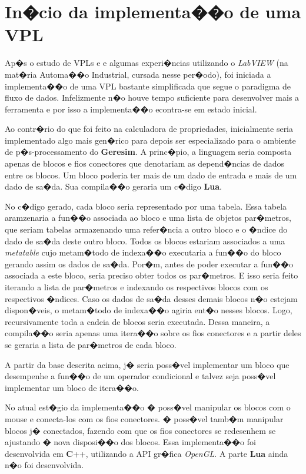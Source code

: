\documentclass[dissertacao,modelo1,brazil]{ThesisPUC}
\begin{document}
\chapter{In�cio da implementa��o de uma VPL}

Ap�s o estudo de VPLs e e algumas experi�ncias utilizando o \emph{LabVIEW}
(na mat�ria Automa��o Industrial, cursada nesse per�odo), foi iniciada
a implementa��o de uma VPL bastante simplificada que segue o paradigma de
fluxo de dados. Infelizmente n�o houve tempo suficiente para desenvolver
mais a ferramenta e por isso a implementa��o econtra-se em estado inicial.

Ao contr�rio do que foi feito na calculadora de propriedades, inicialmente
seria implementado algo mais gen�rico para depois ser especializado para
o ambiente de p�s-processamento do \textbf{Geresim}. A princ�pio, a linguagem
seria composta apenas de blocos e fios conectores que denotariam
as depend�ncias de  dados entre os blocos. Um bloco poderia ter
mais de um dado de entrada e mais de um dado de sa�da.
Sua compila��o geraria um c�digo \textbf{Lua}.

No c�digo gerado, cada bloco seria representado por uma tabela.
Essa tabela aramzenaria a fun��o associada ao bloco e uma lista
de objetos par�metros, que seriam tabelas armazenando uma refer�ncia
a outro bloco e o �ndice do dado de sa�da deste outro bloco. 
Todos os blocos estariam associados a uma \emph{metatable} cujo
metam�todo de indexa��o executaria a fun��o do bloco gerando assim
os dados de sa�da. Por�m, antes de poder executar a fun��o associada
a este bloco, seria preciso obter todos os par�metros. E isso seria
feito iterando a lista de par�metros e indexando os respectivos
blocos com os respectivos �ndices. Caso os dados de sa�da desses
demais blocos n�o estejam dispon�veis, o metam�todo de indexa��o agiria
ent�o nesses blocos. Logo, recursivamente toda a cadeia de blocos seria
executada. Dessa maneira, a compila��o seria apenas uma itera��o sobre os fios
conectores e a partir deles se geraria a lista de par�metros de cada bloco.

A partir da base descrita acima, j� seria poss�vel implementar um bloco
que desempenhe a fun��o de um operador condicional e talvez seja
poss�vel implementar um bloco de itera��o.

No atual est�gio da implementa��o � poss�vel manipular os blocos
com o mouse e conecta-los com os fios conectores. � poss�vel tamb�m
manipular blocos j� conectados, fazendo com que os fios conectores se
redesenhem se ajustando � nova disposi��o dos blocos.
Essa implementa��o foi desenvolvida em \textbf{C}++, utilizando a API gr�fica
\emph{OpenGL}.\cite{OpenGl} 
A parte \textbf{Lua} ainda n�o foi desenvolvida.
\end{document}
